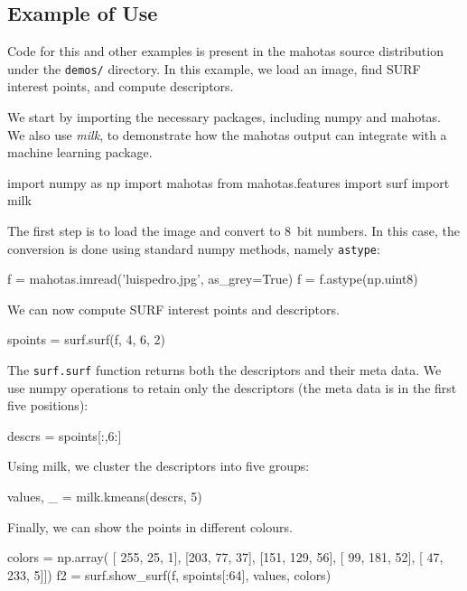 \documentclass{scrartcl}
\let\code\texttt
\begin{document}
\subsection{Example of Use}

Code for this and other examples is present in the mahotas source distribution
under the \texttt{demos/} directory. In this example, we load an image, find
SURF interest points, and compute descriptors.

We start by importing the necessary packages, including numpy and mahotas. We
also use \textit{milk}, to demonstrate how the mahotas output can integrate
with a machine learning package.

\begin{python}
import numpy as np
import mahotas
from mahotas.features import surf
import milk
\end{python}

The first step is to load the image and convert to 8~bit numbers. In this
case, the conversion is done using standard numpy methods, namely
\code{astype}:

\begin{python}
f = mahotas.imread('luispedro.jpg', as_grey=True)
f = f.astype(np.uint8)
\end{python}

We can now compute SURF interest points and descriptors.
\begin{python}
spoints = surf.surf(f, 4, 6, 2)
\end{python}

The \code{surf.surf} function returns both the descriptors and their meta data.
We use numpy operations to retain only the descriptors (the meta data is in the
first five positions):

\begin{python}
descrs = spoints[:,6:]
\end{python}

Using milk, we cluster the descriptors into five groups:

\begin{python}
values, _ = milk.kmeans(descrs, 5)
\end{python}

Finally, we can show the points in different colours.
\begin{python}
colors = np.array(
    [ 255,  25,   1],
    [203,  77,  37],
    [151, 129,  56],
    [ 99, 181,  52],
    [ 47, 233,   5]])
f2 = surf.show_surf(f, spoints[:64], values, colors)
\end{python}
\end{document}
